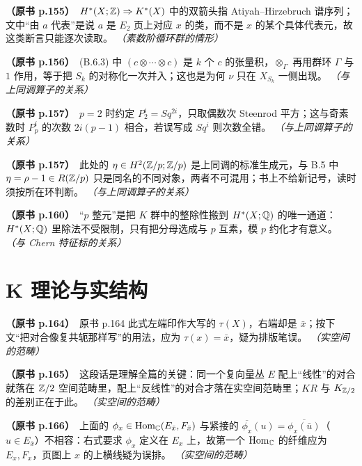 \noindent \textbf{（原书 p.155）}\ $H^*(X;\mathbb{Z})\Rightarrow K^*(X)$ 中的双箭头指 Atiyah–Hirzebruch 谱序列；文中“由 $a$ 代表”是说 $a$ 是 $E_2$ 页上对应 $x$ 的类，而不是 $x$ 的某个具体代表元，故这类断言只能逐次读取。 \textit{（素数阶循环群的情形）}\par\smallskip

\noindent \textbf{（原书 p.156）}\ (B.6.3) 中 $(c\otimes\cdots\otimes c)$ 是 $k$ 个 $c$ 的张量积，$\otimes_\Gamma$ 再用群环 $\Gamma$ 与 $1$ 作用，等于把 $S_k$ 的对称化一次并入；这也是为何 $\nu$ 只在 $X_{S_k}$ 一侧出现。 \textit{（与上同调算子的关系）}\par\smallskip

\noindent \textbf{（原书 p.157）}\ $p=2$ 时约定 $P^i_2=Sq^{2i}$，只取偶数次 Steenrod 平方；这与奇素数时 $P^i_p$ 的次数 $2i(p-1)$ 相合，若误写成 $Sq^i$ 则次数全错。 \textit{（与上同调算子的关系）}\par\smallskip

\noindent \textbf{（原书 p.157）}\ 此处的 $\eta\in H^2(\mathbb{Z}/p;\mathbb{Z}/p)$ 是上同调的标准生成元，与 B.5 中 $\eta=\rho-1\in R(\mathbb{Z}/p)$ 只是同名的不同对象，两者不可混用；书上不给新记号，读时须按所在环判断。 \textit{（与上同调算子的关系）}\par\smallskip

\noindent \textbf{（原书 p.160）}\ “$p$ 整元”是把 $K$ 群中的整除性搬到 $H^*(X;\mathbb{Q})$ 的唯一通道：$H^*(X;\mathbb{Q})$ 里除法不受限制，只有把分母选成与 $p$ 互素，模 $p$ 约化才有意义。 \textit{（与 Chern 特征标的关系）}\par\smallskip

\section*{K 理论与实结构}

\noindent \textbf{（原书 p.164）}\ 原书 p.164 此式左端印作大写的 $\tau(X)$，右端却是 $\bar x$；按下文“把对合像复共轭那样写”的用法，应为 $\tau(x)=\bar x$，疑为排版笔误。 \textit{（实空间的范畴）}\par\smallskip

\noindent \textbf{（原书 p.165）}\ 这段话是理解全篇的关键：同一个复向量丛 $E$ 配上“线性”的对合就落在 $\mathbb{Z}/2$ 空间范畴里，配上“反线性”的对合才落在实空间范畴里；$KR$ 与 $K_{\mathbb{Z}/2}$ 的差别正在于此。 \textit{（实空间的范畴）}\par\smallskip

\noindent \textbf{（原书 p.166）}\ 上面的 $\phi_x\in\operatorname{Hom}_{\mathbb{C}}(E_{\bar x},F_{\bar x})$ 与紧接的 $\overline{\phi_x}(u)=\overline{\phi_x(\bar u)}$（$u\in E_{\bar x}$）不相容：右式要求 $\phi_x$ 定义在 $E_x$ 上，故第一个 $\operatorname{Hom}_{\mathbb{C}}$ 的纤维应为 $E_x,F_x$，页图上 $x$ 的上横线疑为误排。 \textit{（实空间的范畴）}\par\smallskip

